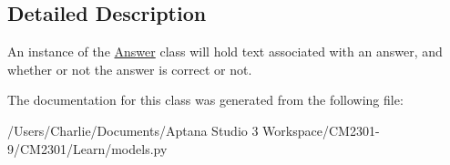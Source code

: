 \subsection{Detailed Description}
An instance of the \hyperlink{class_learn_1_1models_1_1_answer}{Answer} class will hold text associated with an answer, and whether or not the answer is correct or not. 

The documentation for this class was generated from the following file\-:\begin{DoxyCompactItemize}
\item 
/\-Users/\-Charlie/\-Documents/\-Aptana Studio 3 Workspace/\-C\-M2301-\/9/\-C\-M2301/\-Learn/models.\-py\end{DoxyCompactItemize}
